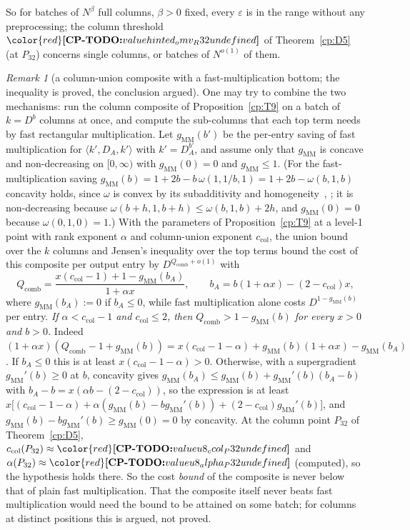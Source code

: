 \documentclass[11pt]{article}
\makeatletter
\theoremstyle{definition}
\theoremstyle{remark}
\newtheorem{remark}[theorem]{Remark}
\DeclareRobustCommand{\CPTODO}[1]{{\color{red}\textbf{[CP-TODO:} #1\textbf{]}}}
\providecommand{\eps}{\varepsilon}
\newcommand{\mat}[3]{\langle #1,#2,#3\rangle} %
\newcommand{\ccol}{c_{\mathrm{col}}}          %
\newcommand{\Pthree}{P_{32}}                  %
\newcommand{\gMM}{g_{\mathrm{MM}}}                   %
\newcommand{\cpv}[1]{\ifcsname cpv@#1\endcsname\csname cpv@#1\endcsname\else\CPTODO{value #1 undefined}\fi}
\makeatother
\begin{document}
So for batches of $N^\beta$ full columns, $\beta>0$ fixed, every $\eps$ is in the range without any preprocessing; the column threshold $\cpv{hinted_omv_R32}$ of Theorem~\ref{cp:D5} (at $\Pthree$) concerns single columns, or batches of $N^{o(1)}$ of them.

\begin{remark}[a column-union composite with a fast-multiplication bottom; the inequality is proved, the conclusion argued]\label{cp:B11}
One may try to combine the two mechanisms: run the column composite of Proposition~\ref{cp:T9} on a batch of $k=D^b$ columns at once, and compute the sub-columns that each top term needs by fast rectangular multiplication. Let $\gMM(b')$ be the per-entry saving of fast multiplication for $\mat{k'}{D_A}{k'}$ with $k'=D_A^{b'}$, and assume only that $\gMM$ is concave and non-decreasing on $[0,\infty)$ with $\gMM(0)=0$ and $\gMM\le1$. (For the fast-multiplication saving $\gMM(b)=1+2b-b\,\omega(1,1/b,1)=1+2b-\omega(b,1,b)$ concavity holds, since $\omega$ is convex by its subadditivity and homogeneity~\cite{LR83}, \cite[Facts~2.4 and~2.5]{ABFK24}; it is non-decreasing because $\omega(b+h,1,b+h)\le\omega(b,1,b)+2h$, and $\gMM(0)=0$ because $\omega(0,1,0)=1$.) With the parameters of Proposition~\ref{cp:T9} at a level-1 point with rank exponent $\alpha$ and column-union exponent $\ccol$, the union bound over the $k$ columns and Jensen's inequality over the top terms bound the cost of this composite per output entry by $D^{Q_{\mathrm{comb}}+o(1)}$ with
\[
Q_{\mathrm{comb}}=\frac{x(\ccol-1)+1-\gMM(b_A)}{1+\alpha x},\qquad b_A=b(1+\alpha x)-(2-\ccol)x,
\]
where $\gMM(b_A):=0$ if $b_A\le0$, while fast multiplication alone costs $D^{1-\gMM(b)}$ per entry. \emph{If $\alpha<\ccol-1$ and $\ccol\le2$, then $Q_{\mathrm{comb}}>1-\gMM(b)$ for every $x>0$ and $b>0$.} Indeed $(1+\alpha x)(Q_{\mathrm{comb}}-1+\gMM(b))=x(\ccol-1-\alpha)+\gMM(b)(1+\alpha x)-\gMM(b_A)$. If $b_A\le0$ this is at least $x(\ccol-1-\alpha)>0$. Otherwise, with a supergradient $\gMM'(b)\ge0$ at $b$, concavity gives $\gMM(b_A)\le\gMM(b)+\gMM'(b)(b_A-b)$ with $b_A-b=x(\alpha b-(2-\ccol))$, so the expression is at least $x\bigl[(\ccol-1-\alpha)+\alpha(\gMM(b)-b\gMM'(b))+(2-\ccol)\gMM'(b)\bigr]$, and $\gMM(b)-b\gMM'(b)\ge\gMM(0)=0$ by concavity. At the column point $\Pthree$ of Theorem~\ref{cp:D5}, $\ccol(\Pthree)\approx\cpv{u8_ccol_P32}$ and $\alpha(\Pthree)\approx\cpv{u8_alpha_P32}$ (computed), so the hypothesis holds there. So the cost \emph{bound} of the composite is never below that of plain fast multiplication. That the composite itself never beats fast multiplication would need the bound to be attained on some batch; for columns at distinct positions this is argued, not proved.
\end{remark}
\end{document}
